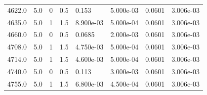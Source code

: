 \documentclass[preview]{standalone}
\begin{document}
{{{\begin{tabular}{L{1.2cm}C{1.2cm} C{0.3cm}C{0.5cm} C{1.4cm}C{1.4cm} C{1.4cm}C{1.4cm}}
  4622.0  &   5.0  & 0     & 0.5 &  0.153  & 5.000e-03  & 0.0601 &  3.006e-03   \\ 
  4635.0  &   5.0  & 1     & 1.5 &  8.900e-03  & 5.000e-04  & 0.0601 &  3.006e-03   \\ 
  4660.0  &   5.0  & 0     & 0.5 &  0.0685  & 2.000e-03  & 0.0601 &  3.006e-03   \\ 
  4708.0  &   5.0  & 1     & 1.5 &  4.750e-03  & 5.000e-04  & 0.0601 &  3.006e-03   \\ 
  4714.0  &   5.0  & 1     & 1.5 &  4.600e-03  & 5.000e-04  & 0.0601 &  3.006e-03   \\ 
  4740.0  &   5.0  & 0     & 0.5 &  0.113  & 3.000e-03  & 0.0601 &  3.006e-03   \\ 
  4755.0  &   5.0  & 1     & 1.5 &  6.800e-03  & 4.500e-04  & 0.0601 &  3.006e-03   \\ 
\hline 
\end{tabular} 

}}}
\end{document}
